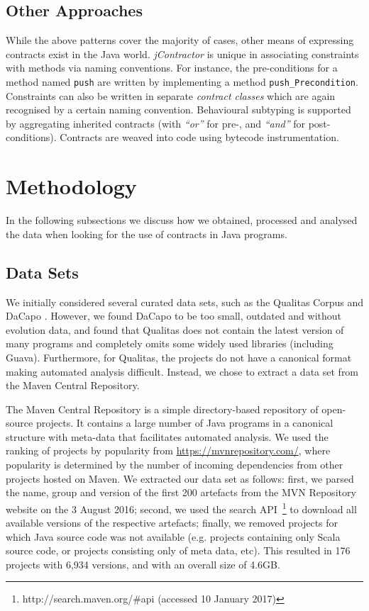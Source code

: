 \documentclass[a4paper,UKenglish]{lipics-v2016}
\begin{document}
\subsection{Other Approaches}


While the above patterns cover the majority of cases, other means of expressing contracts exist in the Java world.  \textit{jContractor} \cite{karaorman1999jcontractor} is unique in associating constraints with methods via naming conventions. For instance, the pre-conditions for a method named \texttt{push} are written by implementing a method \texttt{push\_Precondition}. Constraints can also be written in separate \textit{contract classes} which are again recognised by a certain naming convention. Behavioural subtyping is supported by aggregating inherited contracts (with \textit{``or''} for pre-, and \textit{``and''} for post-conditions). Contracts are weaved into code using bytecode instrumentation. 


\section{Methodology}

In the following subsections we discuss how we obtained, processed and analysed the data when looking for the use of contracts in Java programs.

\subsection{Data Sets}
\label{ssec:meth:dataset}

We initially considered several curated data sets, such as the Qualitas Corpus \cite{tempero2010qualitas} and DaCapo \cite{blackburn2006dacapo}.  However, we found DaCapo to be too small, outdated and without evolution data, and found that Qualitas does not contain the latest version of many programs and completely omits some widely used libraries (including Guava). Furthermore, for Qualitas, the projects do not have a canonical format making automated analysis difficult. Instead, we chose to extract a data set from the Maven Central Repository.

The Maven Central Repository is a simple directory-based repository of open-source projects.  It contains a large number of Java programs in a canonical structure with meta-data that facilitates automated analysis.  We used the ranking of projects by popularity from \url{https://mvnrepository.com/}, where popularity is determined by the number of incoming dependencies from other projects hosted on Maven.  We extracted our data set as follows: first, we parsed the name, group and version of the first 200 artefacts from the MVN Repository website on the 3 August 2016; second, we used the search API~\footnote{http://search.maven.org/\#api  (accessed 10 January 2017)} to download all available versions of the respective artefacts; finally, we removed projects for which Java source code was not available (e.g. projects containing only Scala source code, or projects consisting only of meta data, etc). This resulted in 176 projects with 6,934 versions, and with an overall size of 4.6GB.
\end{document}
